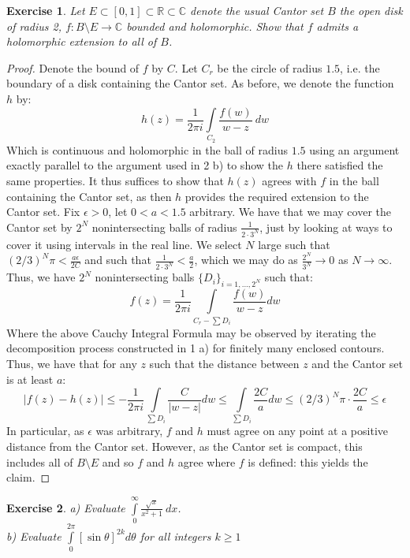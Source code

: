 \documentclass{article}
\newcommand{\bb}[1]{\mathbb{#1}}
\newtheorem{exercise}{Exercise}
\begin{document}
\begin{exercise}
  Let $E \subset [0,1] \subset \bb{R} \subset \bb{C}$ denote the usual Cantor set $B$ the open disk of radius 2, $f: B \setminus E \to \bb{C}$ bounded and holomorphic. Show that $f$ admits a holomorphic extension to all of $B$.
\end{exercise}
\begin{proof}
  Denote the bound of $f$ by $C$. Let $C_{r}$ be the circle of radius $1.5$, i.e. the boundary of a disk containing the Cantor set. As before, we denote the function $h$ by:
  \[
    h(z) = \frac{1}{2\pi i}\int\limits_{C_{2}} \frac{f(w)}{w - z} \ dw
  \]
  Which is continuous and holomorphic in the ball of radius $1.5$ using an argument exactly parallel to the argument used in 2 b) to show the $h$ there satisfied the same properties. It thus suffices to show that $h(z)$ agrees with $f$ in the ball containing the Cantor set, as then $h$ provides the required extension to the Cantor set. Fix $ \epsilon > 0$, let $0 < a < 1.5$ arbitrary. We have that we may cover the Cantor set by $2^{N}$ nonintersecting balls of radius $\frac{1}{2\cdot 3^{N}}$, just by looking at ways to cover it using intervals in the real line. We select $N$ large such that $(2/3)^{N}\pi < \frac{a \epsilon}{2C}$ and such that $\frac{1}{2\cdot3^{N}} < \frac{a}{2}$, which we may do as $\frac{2^{N}}{3^{N}} \to 0$ as $N \to \infty$. Thus, we have $2^{N}$ nonintersecting balls $\{D_{i}\}_{i= 1,...,2^{N}}$ such that:
  \[
    f(z) = \frac{1}{2\pi i}\int\limits_{C_{r} - \sum D_{i}} \frac{f(w)}{w-z} dw
  \]
  Where the above Cauchy Integral Formula may be observed by iterating the decomposition process constructed in 1 a) for finitely many enclosed contours. Thus, we have that for any $z$ such that the distance between $z$ and the Cantor set is at least $a$:
  \[
    |f(z) - h(z)| \leq -\frac{1}{2\pi i} \int\limits_{\sum D_{i}}\frac{C}{|w - z|} dw \leq \int\limits_{\sum D_{i}}\frac{2C}{a} dw \leq (2/3)^{N}\pi \cdot \frac{2C}{a} \leq \epsilon
  \]
  In particular, as $\epsilon$ was arbitrary, $f$ and $h$ must agree on any point at a positive distance from the Cantor set. However, as the Cantor set is compact, this includes all of $B \setminus E$ and so $f$ and $h$ agree where $f$ is defined: this yields the claim. 
\end{proof}
\begin{exercise}
  a) Evaluate $\int\limits_{0}^{\infty}\frac{\sqrt{x}}{x^{2}+1} \ dx$. \\
  b) Evaluate $\int\limits_{0}^{2\pi}[\sin\theta]^{2k}d\theta$ for all integers $k\geq 1$
\end{exercise}
\end{document}
